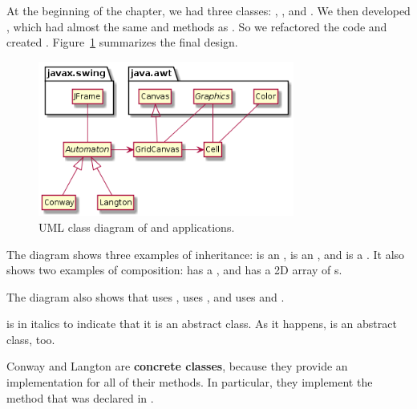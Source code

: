 At the beginning of the chapter, we had three classes: , , and .
We then developed , which had almost the same  and  methods as .
So we refactored the code and created .
Figure~\ref{fig:uml2} summarizes the final design.

\begin{figure}[!ht]
\begin{center}
\includegraphics[width=0.75\textwidth]{figs/uml2.png}
\caption{UML class diagram of  and  applications.}
\label{fig:uml2}
\end{center}
\end{figure}


The diagram shows three examples of inheritance:  is an ,  is an , and  is a .
It also shows two examples of composition:  has a , and  has a 2D array of s.

The diagram also shows that  uses ,  uses , and  uses  and .

 is in italics to indicate that it is an abstract class.
As it happens,  is an abstract class, too.


Conway and Langton are {\bf concrete classes}, because they provide an implementation for all of their methods.
In particular, they implement the  method that was declared  in .



